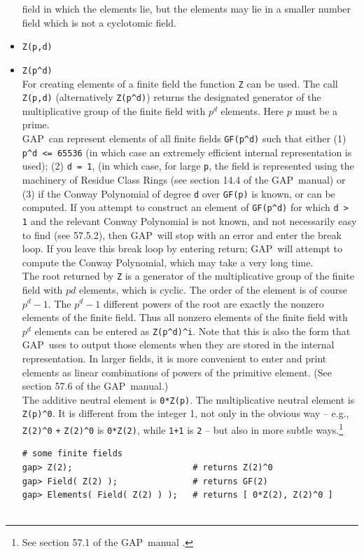 \documentclass[11pt]{amsart}
\newcommand{\gap}{GAP}   %
\theoremstyle{plain}
\newcommand{\codesize}{\footnotesize}
\newcommand{\<}{\ensuremath{\langle}}
\renewcommand{\>}{\ensuremath{\rangle}}
\begin{document}
\begin{itemize}
field in which the elements lie, but the elements may lie in a smaller number field
which is not a cyclotomic field. 
\item \verb.Z(p,d).
\item \verb.Z(p^d).\\
For creating elements of a finite field the function {\tt Z} can be used. The call
{\tt Z(p,d)} (alternatively \verb.Z(p^d).) returns the designated generator of the
multiplicative group of the finite field with $p^d$ elements. Here $p$ must be a prime.
\\[4pt]
\gap\ can represent elements of all finite fields \verb|GF(p^d)| such that
either (1) \verb|p^d <= 65536| (in which case an extremely efficient internal
representation is used); (2) {\tt d = 1}, (in which case, for large {\tt p}, the
field is represented using the machinery of Residue Class Rings (see section
14.4 of the \gap\ manual) or (3) if the Conway Polynomial of
degree {\tt d} over {\tt GF(p)} is known, or can be computed.
If you attempt to construct an element of \verb|GF(p^d)| 
for which \verb|d > 1| and the relevant Conway Polynomial
is not known, and not necessarily easy to find (see 57.5.2), 
then \gap\ will stop with an error and enter the break loop. If you leave this
break loop by entering return; \gap\ will attempt to compute the Conway 
Polynomial, which may take a very long time.
\\[4pt]
The root returned by {\tt Z} is a generator of the multiplicative group of the finite
field with $p d$ elements, which is cyclic. The order of the element is of course
$p^d-1$.  The $p^d-1$ different powers of the root are exactly the nonzero elements
of the finite field. Thus all nonzero elements of the finite field with $p^d$
elements can be entered as \verb.Z(p^d)^i.. Note that this is also the form that
\gap\ uses to output those elements when they are stored in the internal
representation. In larger fields, it is more convenient to enter and print elements
as linear combinations of powers of the  primitive element. 
(See section 57.6 of the \gap\ manual.)
\\[4pt]
The additive neutral element is {\tt 0*Z(p)}. 
The multiplicative neutral element is \verb.Z(p)^0.. 
It is different from the integer 1, not only in the obvious way -- e.g.,
\verb.Z(2)^0. {\tt +} \verb.Z(2)^0. is {\tt 0*Z(2)},  while {\tt 1+1} is {\tt 2} --
but also in 
more subtle ways.\footnote{See section 57.1 of the \gap\ manual \cite{gapmanual}.}
{\codesize
\begin{verbatim}
# some finite fields
gap> Z(2);                        # returns Z(2)^0
gap> Field( Z(2) );               # returns GF(2)
gap> Elements( Field( Z(2) ) );   # returns [ 0*Z(2), Z(2)^0 ]


\end{verbatim}}
\end{itemize}
\end{document}
